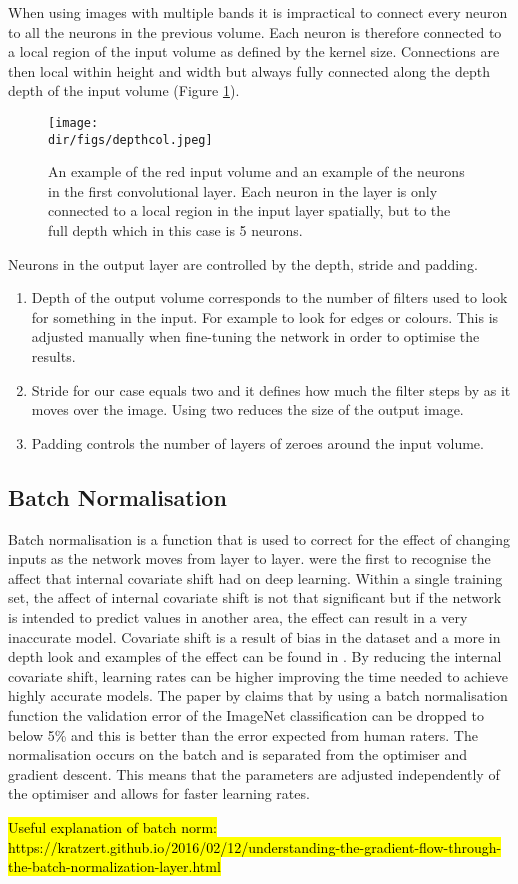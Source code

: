 When using images with multiple bands it is impractical to connect every neuron to all the neurons in the previous volume. Each neuron is therefore connected to a local region of the input volume as defined by the kernel size. Connections are then local within height and width but always fully connected along the depth depth of the input volume (Figure \ref{fig.conv_layer}). 
\begin{figure}[H]
    \centering
    \texttt{[image: \\dir/figs/depthcol.jpeg]}
    \caption[CONV Layer]{An example of the red input volume and an example of the neurons in the first convolutional layer. Each neuron in the layer is only connected to a local region in the input layer spatially, but to the full depth which in this case is 5 neurons.}
    \label{fig.conv_layer}
\end{figure}
Neurons in the output layer are controlled by the depth, stride and padding. 
\begin{enumerate}
    \item Depth of the output volume corresponds to the number of filters used to look for something in the input. For example to look for edges or colours. This is adjusted manually when fine-tuning the network in order to optimise the results.
    \item Stride for our case equals two and it defines how much the filter steps by as it moves over the image. Using two reduces the size of the output image.
    \item Padding controls the number of layers of zeroes around the input volume. 
\end{enumerate}
\subsection{Batch Normalisation}
Batch normalisation is a function that is used to correct for the effect of changing inputs as the network moves from layer to layer. \citet{ioffe15} were the first to recognise the affect that internal covariate shift had on deep learning. Within a single training set, the affect of internal covariate shift is not that significant but if the network is intended to predict values in another area, the effect can result in a very inaccurate model. Covariate shift is a result of bias in the dataset and a more in depth look and examples of the effect can be found in \citet{smola11}. By reducing the internal covariate shift, learning rates can be higher improving the time needed to achieve highly accurate models. The paper by \citet{ioffe15} claims that by using a batch normalisation function the validation error of the ImageNet classification can be dropped to below 5\% and this is better than the error expected from human raters. The normalisation occurs on the batch and is separated from the optimiser and gradient descent. This means that the parameters are adjusted independently of the optimiser and allows for faster learning rates. 
\par
\hl{Useful explanation of batch norm: https://kratzert.github.io/2016/02/12/understanding-the-gradient-flow-through-the-batch-normalization-layer.html}

